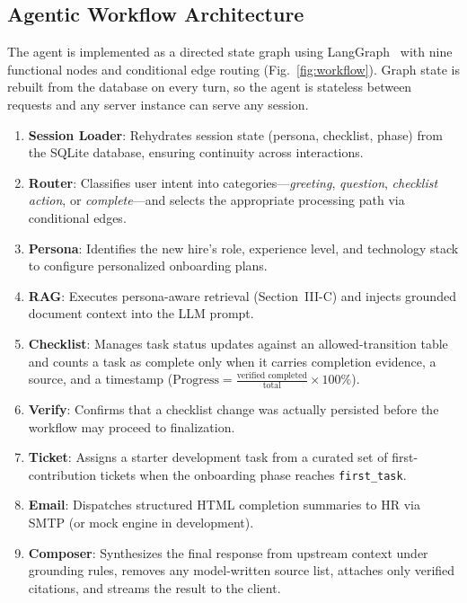 \documentclass[conference]{IEEEtran}
\begin{document}
\subsection{Agentic Workflow Architecture}

The agent is implemented as a directed state graph using LangGraph~\cite{langgraph2024} with nine functional nodes and conditional edge routing (Fig.~\ref{fig:workflow}). Graph state is rebuilt from the database on every turn, so the agent is stateless between requests and any server instance can serve any session.

\begin{enumerate}
    \item \textbf{Session Loader}: Rehydrates session state (persona, checklist, phase) from the SQLite database, ensuring continuity across interactions.
    \item \textbf{Router}: Classifies user intent into categories---\textit{greeting}, \textit{question}, \textit{checklist action}, or \textit{complete}---and selects the appropriate processing path via conditional edges.
    \item \textbf{Persona}: Identifies the new hire's role, experience level, and technology stack to configure personalized onboarding plans.
    \item \textbf{RAG}: Executes persona-aware retrieval (Section~III-C) and injects grounded document context into the LLM prompt.
    \item \textbf{Checklist}: Manages task status updates against an allowed-transition table and counts a task as complete only when it carries completion evidence, a source, and a timestamp ($\text{Progress} = \frac{\text{verified completed}}{\text{total}} \times 100\%$).
    \item \textbf{Verify}: Confirms that a checklist change was actually persisted before the workflow may proceed to finalization.
    \item \textbf{Ticket}: Assigns a starter development task from a curated set of first-contribution tickets when the onboarding phase reaches \texttt{first\_task}.
    \item \textbf{Email}: Dispatches structured HTML completion summaries to HR via SMTP (or mock engine in development).
    \item \textbf{Composer}: Synthesizes the final response from upstream context under grounding rules, removes any model-written source list, attaches only verified citations, and streams the result to the client.
\end{enumerate}
\end{document}
